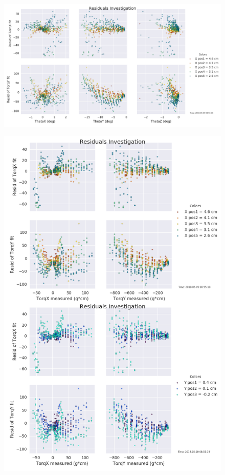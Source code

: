 \documentclass[preprint,12pt,3p]{elsarticle}
\begin{document}
\begin{figure}[H]
\centering
\includegraphics[width=1\textwidth]{images/round1/resids_Theta_coloredX.png}
\end{figure}

\begin{figure}[H]
\centering
\includegraphics[width=.95\textwidth]{images/round1/resids_Torq.png}
\end{figure}
\end{document}
